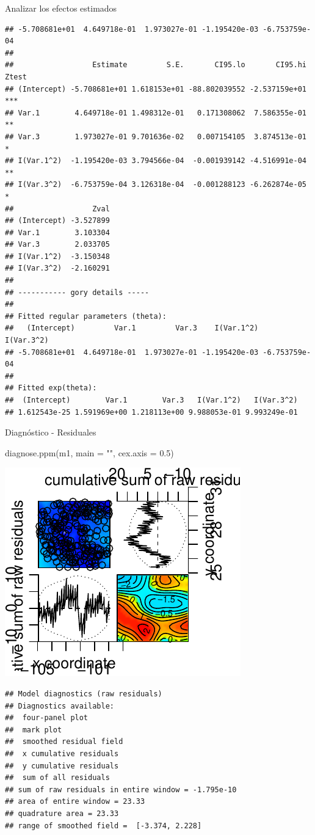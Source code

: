 \documentclass[
  11pt,
  ignorenonframetext,
]{beamer}
\newenvironment{Shaded}{}{}
\newcommand{\AttributeTok}[1]{\textcolor[rgb]{0.49,0.56,0.16}{#1}}
\newcommand{\FloatTok}[1]{\textcolor[rgb]{0.25,0.63,0.44}{#1}}
\newcommand{\FunctionTok}[1]{\textcolor[rgb]{0.02,0.16,0.49}{#1}}
\newcommand{\NormalTok}[1]{#1}
\newcommand{\StringTok}[1]{\textcolor[rgb]{0.25,0.44,0.63}{#1}}
\begin{document}
\begin{frame}[fragile]{Analizar los efectos estimados}
\begin{verbatim}
## -5.708681e+01  4.649718e-01  1.973027e-01 -1.195420e-03 -6.753759e-04 
## 
##                  Estimate         S.E.       CI95.lo       CI95.hi Ztest
## (Intercept) -5.708681e+01 1.618153e+01 -88.802039552 -2.537159e+01   ***
## Var.1        4.649718e-01 1.498312e-01   0.171308062  7.586355e-01    **
## Var.3        1.973027e-01 9.701636e-02   0.007154105  3.874513e-01     *
## I(Var.1^2)  -1.195420e-03 3.794566e-04  -0.001939142 -4.516991e-04    **
## I(Var.3^2)  -6.753759e-04 3.126318e-04  -0.001288123 -6.262874e-05     *
##                  Zval
## (Intercept) -3.527899
## Var.1        3.103304
## Var.3        2.033705
## I(Var.1^2)  -3.150348
## I(Var.3^2)  -2.160291
## 
## ----------- gory details -----
## 
## Fitted regular parameters (theta):
##   (Intercept)         Var.1         Var.3    I(Var.1^2)    I(Var.3^2) 
## -5.708681e+01  4.649718e-01  1.973027e-01 -1.195420e-03 -6.753759e-04 
## 
## Fitted exp(theta):
##  (Intercept)        Var.1        Var.3   I(Var.1^2)   I(Var.3^2) 
## 1.612543e-25 1.591969e+00 1.218113e+00 9.988053e-01 9.993249e-01
\end{verbatim}
\end{frame}

\begin{frame}[fragile]{Diagnóstico - Residuales}
\protect\hypertarget{diagnuxf3stico---residuales}{}
\begin{Shaded}
\begin{Highlighting}[]
\FunctionTok{diagnose.ppm}\NormalTok{(m1, }\AttributeTok{main =} \StringTok{""}\NormalTok{, }\AttributeTok{cex.axis =} \FloatTok{0.5}\NormalTok{)}
\end{Highlighting}
\end{Shaded}

\includegraphics{Tutorial-spatstat-2_files/figure-beamer/unnamed-chunk-17-1.pdf}

\begin{verbatim}
## Model diagnostics (raw residuals)
## Diagnostics available:
##  four-panel plot
##  mark plot 
##  smoothed residual field
##  x cumulative residuals
##  y cumulative residuals
##  sum of all residuals
## sum of raw residuals in entire window = -1.795e-10
## area of entire window = 23.33
## quadrature area = 23.33
## range of smoothed field =  [-3.374, 2.228]
\end{verbatim}
\end{frame}
\end{document}
